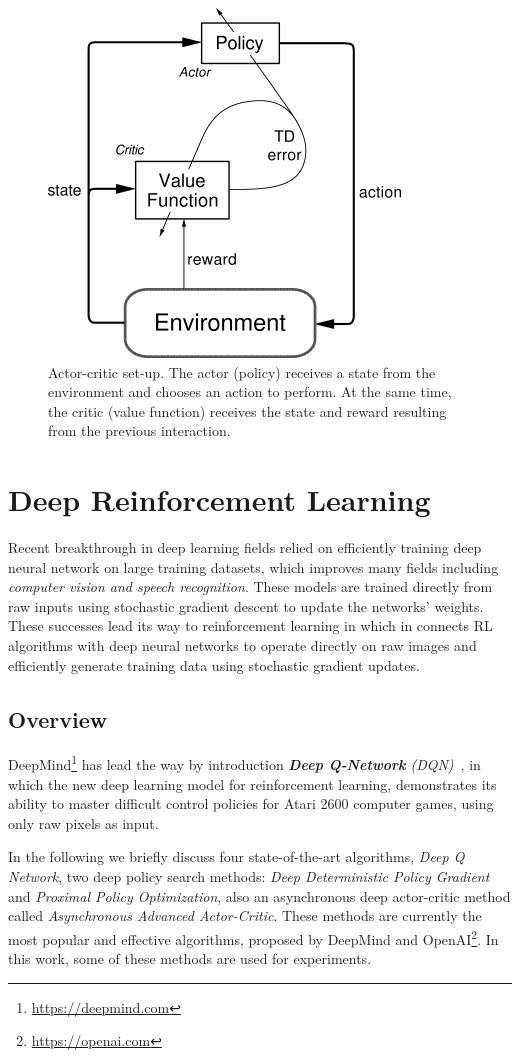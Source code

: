 \begin{figure}[H]
		\begin{center}
				\includegraphics[width=.3\linewidth]{figures/actor_critic.png}
				\caption{Actor-critic set-up. The actor (policy) receives a state from the environment and chooses an action to perform. At the same time, the critic (value function) receives the state and reward resulting from the previous interaction.~\parencite{arulkumaran2017brief}}
				\label{fig:actor_critic}
		\end{center}
\end{figure}


\clearpage

\section{Deep Reinforcement Learning}

Recent breakthrough in deep learning fields relied on efficiently training deep neural network on large training datasets, which improves many fields including \textit{computer vision and speech recognition}. These models are trained directly from raw inputs using stochastic gradient descent to update the networks' weights. These successes lead its way to reinforcement learning in which in connects RL algorithms with deep neural networks to operate directly on raw images and efficiently generate training data using stochastic gradient updates.

\subsection{Overview}
DeepMind\footnote{\url{https://deepmind.com}\label{deepmind}} has lead the way by introduction \textit{\textbf{Deep Q-Network} (DQN)}~\parencite{mnih2015human}, in which the new deep learning model for reinforcement learning, demonstrates its ability to master difficult control policies for Atari 2600 computer games, using only raw pixels as input.

In the following we briefly discuss four state-of-the-art algorithms, \textit{Deep Q Network}, two deep policy search methods: \textit{Deep Deterministic Policy Gradient} and \textit{Proximal Policy Optimization}, also an asynchronous deep actor-critic method called \textit{Asynchronous Advanced Actor-Critic}.
These methods are currently the most popular and effective algorithms, proposed by DeepMind and OpenAI\footnote{\url{https://openai.com}}. In this work, some of these methods are used for experiments.

